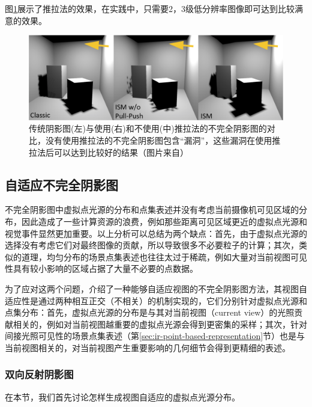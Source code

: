 图\ref{f:ir-pull-push}展示了推拉法的效果，在实践中，只需要2，3级低分辨率图像即可达到比较满意的效果。

\begin{figure}
	\includegraphics[width=1.\textwidth]{figures/ir/ir-4-1}
	\caption{传统阴影图(左)与使用(右)和不使用(中)推拉法的不完全阴影图的对比，没有使用推拉法的不完全阴影图包含“漏洞”，这些漏洞在使用推拉法后可以达到比较好的结果（图片来自\cite{a:ImperfectShadowMapsforEfficientComputationofIndirectIllumination}）}
	\label{f:ir-pull-push}
\end{figure}




\subsection{自适应不完全阴影图}\label{sec:ir-AISM}
不完全阴影图中虚拟点光源的分布和点集表述并没有考虑当前摄像机可见区域的分布，因此造成了一些计算资源的浪费，例如那些距离可见区域更近的虚拟点光源和视觉事件显然更加重要。以上分析可以总结为两个缺点：首先，由于虚拟点光源的选择没有考虑它们对最终图像的贡献，所以导致很多不必要粒子的计算；其次，类似的道理，均匀分布的场景点集表述也往往太过于稀疏，例如大量对当前视图可见性具有较小影响的区域占据了大量不必要的点数据。

为了应对这两个问题，\cite{a:MakingImperfectShadowMapsViewAdaptive}介绍了一种能够自适应视图的不完全阴影图方法，其视图自适应性是通过两种相互正交（不相关）的机制实现的，它们分别针对虚拟点光源和点集分布：首先，虚拟点光源的分布是与其对当前视图（current view）的光照贡献相关的，例如对当前视图越重要的虚拟点光源会得到更密集的采样；其次，针对间接光照可见性的场景点集表述（第\ref{sec:ir-point-based-representation}节）也是与当前视图相关的，对当前视图产生重要影响的几何细节会得到更精细的表述。




\subsubsection{双向反射阴影图}
在本节，我们首先讨论怎样生成视图自适应的虚拟点光源分布。

